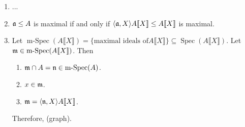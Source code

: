 \begin{proposition}
\begin{enumerate}
        \item ...
        \item $\mathfrak{a} \leq A$ is maximal if and only if $\langle \mathfrak{a},X \rangle A \llbracket X \rrbracket \leq A \llbracket X \rrbracket$ is maximal.
        \item Let $\operatorname{m-Spec}(A\llbracket X \rrbracket) = \{\text{maximal ideals of}A\llbracket X \rrbracket\} \subseteq \operatorname{Spec}(A\llbracket X \rrbracket)$. Let $\mathfrak{m} \in \operatorname{m-Spec}(A\llbracket X \rrbracket)$. Then 
            \begin{enumerate}
                \item $\mathfrak{m} \cap A = \mathfrak{n} \in \operatorname{m-Spec}(A)$.
                \item $x \in \mathfrak{m}$.
                \item $\mathfrak{m} = \langle \mathfrak{n},X \rangle A\llbracket X \rrbracket$.
            \end{enumerate}
            Therefore, (graph).
    \end{enumerate}
\end{proposition}

